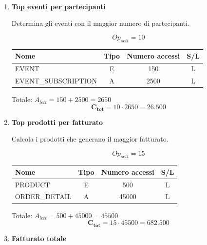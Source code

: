 \documentclass[a4paper,12pt]{report}
\begin{document}
\begin{enumerate}
    \item {\large \textbf{Top eventi per partecipanti}} \label{op3}
    
    Determina gli eventi con il maggior numero di partecipanti.
    
    $$Op_{sett} = 10$$
    
    \begin{table}[H]
        \centering
        \small
        \renewcommand{\arraystretch}{1.15}
        \begin{tabularx}{0.9\textwidth}{|X|c|c|c|}
            \hline
            \rowcolor{gray!20}
            \textbf{Nome} & \textbf{Tipo} & \textbf{Numero accessi} & \textbf{S/L} \\
            \hline
            EVENT & E & 150 & L \\
            EVENT\_SUBSCRIPTION & A & 2500 & L \\
            \hline
        \end{tabularx}
    \end{table}
    
    Totale: $A_{lett} = 150 + 2500 = 2650$
    $$\mathbf{C_{tot}} = 10 \cdot 2650 = \mathbf{26.500}$$

    \item {\large \textbf{Top prodotti per fatturato}} \label{op4}
    
    Calcola i prodotti che generano il maggior fatturato.
    
    $$Op_{sett} = 15$$
    
    \begin{table}[H]
        \centering
        \small
        \renewcommand{\arraystretch}{1.15}
        \begin{tabularx}{0.9\textwidth}{|X|c|c|c|}
            \hline
            \rowcolor{gray!20}
            \textbf{Nome} & \textbf{Tipo} & \textbf{Numero accessi} & \textbf{S/L} \\
            \hline
            PRODUCT & E & 500 & L \\
            ORDER\_DETAIL & A & 45000 & L \\
            \hline
        \end{tabularx}
    \end{table}
    
    Totale: $A_{lett} = 500 + 45000 = 45500$
    $$\mathbf{C_{tot}} = 15 \cdot 45500 = \mathbf{682.500}$$

    \item {\large \textbf{Fatturato totale}} \label{op5}
    

\end{enumerate}
\end{document}

